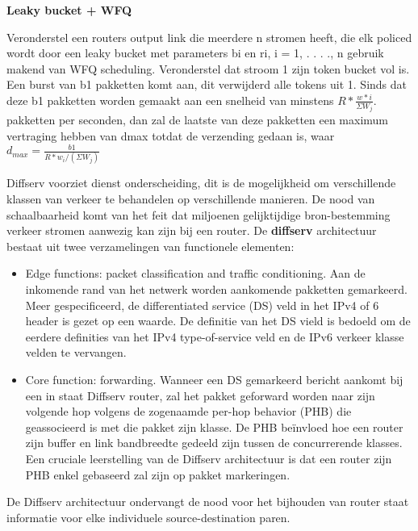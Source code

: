 \noindent \textbf{Leaky bucket + WFQ}

\noindent Veronderstel een routers output link die meerdere n stromen heeft, die elk policed wordt door een leaky bucket met parameters bi en ri, i = 1, . . . ., n gebruik makend van WFQ scheduling. Veronderstel dat stroom 1 zijn token bucket vol is. Een burst van b1 pakketten komt aan, dit verwijderd alle tokens uit 1. Sinds dat deze b1 pakketten worden gemaakt aan een snelheid van minstens $R * \frac{w*i}{\Sigma W_j}$. pakketten per seconden, dan zal de laatste van deze pakketten een maximum vertraging hebben van dmax totdat de verzending gedaan is, waar $d_{max} = \frac{b1}{R * w_i / (\Sigma W_j)}$

\newpage


\noindent Diffserv voorziet dienst onderscheiding, dit is de mogelijkheid om verschillende klassen van verkeer te behandelen op verschillende manieren. De nood van schaalbaarheid komt van het feit dat miljoenen gelijktijdige bron-bestemming verkeer stromen aanwezig kan zijn bij een router.
De \textbf{diffserv} architectuur bestaat uit twee verzamelingen van functionele elementen:
\begin{itemize}
 \item	Edge functions: packet classification and traffic conditioning. Aan de inkomende rand van het netwerk worden aankomende pakketten gemarkeerd. Meer gespecificeerd, de differentiated service (DS) veld in het IPv4 of 6 header is gezet op een waarde. De definitie van het DS vield is bedoeld om de eerdere definities van het IPv4 type-of-service veld en de IPv6 verkeer klasse velden te vervangen.
\item	Core function: forwarding. Wanneer een DS gemarkeerd bericht aankomt bij een in staat Diffserv router, zal het pakket geforward worden naar zijn volgende hop volgens de zogenaamde per-hop behavior (PHB) die geassocieerd is met die pakket zijn klasse. De PHB beïnvloed hoe een router zijn buffer en link bandbreedte gedeeld zijn tussen de concurrerende klasses. Een cruciale leerstelling van de Diffserv architectuur is dat een router zijn PHB enkel gebaseerd zal zijn op pakket markeringen.
\end{itemize}
De Diffserv architectuur ondervangt de nood voor het bijhouden van router staat informatie voor elke individuele source-destination paren.

